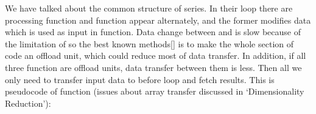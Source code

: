 \documentclass{article}
\begin{document}
\noindent{}We have talked about the common structure of  series. In their  loop there are processing function and  function appear alternately, and the former modifies data which is used as input in function. Data change between  and  is slow because of the limitation of  so the best known methods[] is to make the whole section of code an offload unit, which could reduce most of data transfer. In addition, if all three  function are offload units, data transfer between them is less. Then all we only need to transfer input data to  before loop and fetch results. This is pseudocode of  function (issues about array transfer discussed in \textquoteleft{}Dimensionality Reduction\textquoteright{}):%
\end{document}
